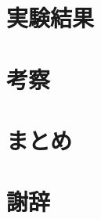 \documentclass[dvipdfmx]{jsreport}
\numberwithin{equation}{chapter}
\numberwithin{table}{chapter}
\begin{document}
\chapter{実験結果}
\chapter{考察}
\chapter{まとめ}
\chapter{謝辞}




\nocite{st,Peskin,spin_oxford,alma9926360528004034,alma990023076750204034,alma990023937250204034,ku,neko}
\end{document}
